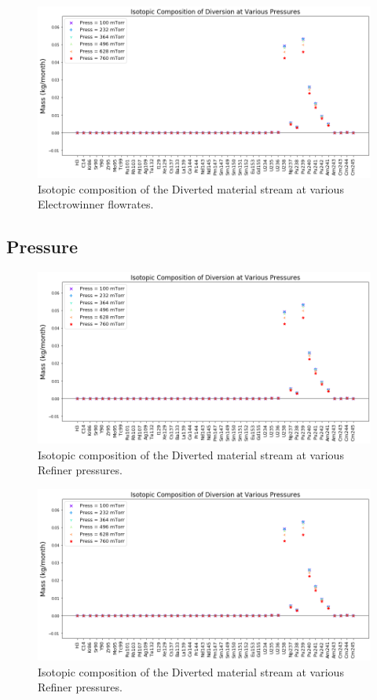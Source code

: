 \begin{figure}
	\includegraphics[width=\linewidth]{images/pressure-sa-comp}
	\caption{Isotopic composition of the Diverted material stream at various Electrowinner flowrates.}
	\label{fig:win-flow-diff}
\end{figure}

\subsection{Pressure}

\begin{figure}
	\includegraphics[width=\linewidth]{images/pressure-sa-comp}
	\caption{Isotopic composition of the Diverted material stream at various Refiner pressures.}
	\label{fig:win-cur-sa}
\end{figure}

\begin{figure}
	\includegraphics[width=\linewidth]{images/pressure-sa-comp}
	\caption{Isotopic composition of the Diverted material stream at various Refiner pressures.}
	\label{fig:win-cur-diff}
\end{figure}


